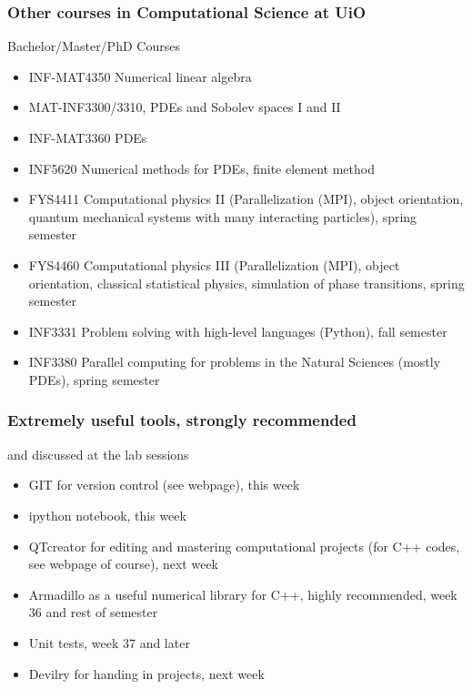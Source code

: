 \documentclass{beamer}
\begin{document}
\begin{frame}
\frametitle{Other courses in Computational Science at UiO}

\begin{block}{Bachelor/Master/PhD Courses }
\begin{itemize}
  \item INF-MAT4350 Numerical linear algebra

  \item MAT-INF3300/3310, PDEs and Sobolev spaces I and II

  \item INF-MAT3360 PDEs

  \item INF5620 Numerical methods for PDEs, finite element method

  \item FYS4411 Computational physics II (Parallelization (MPI), object orientation, quantum mechanical systems with many interacting particles), spring semester

  \item FYS4460 Computational physics III (Parallelization (MPI), object orientation, classical statistical physics, simulation of phase transitions, spring semester

  \item INF3331 Problem solving with high-level languages (Python), fall semester

  \item INF3380 Parallel computing for problems in the Natural Sciences (mostly PDEs), spring semester
\end{itemize}

\noindent
\end{block}
\end{frame}

\begin{frame}
\frametitle{Extremely useful tools, strongly recommended}

\begin{block}{and discussed at the lab sessions }
\begin{itemize}
  \item GIT for version control (see webpage), this week

  \item ipython notebook, this week

  \item QTcreator for editing and mastering computational projects (for C++ codes, see webpage of course), next week

  \item Armadillo as a useful numerical library for C++, highly recommended, week 36 and rest of semester

  \item Unit tests, week 37 and later

  \item Devilry for handing in projects, next week
\end{itemize}

\noindent
\end{block}
\end{frame}
\end{document}

